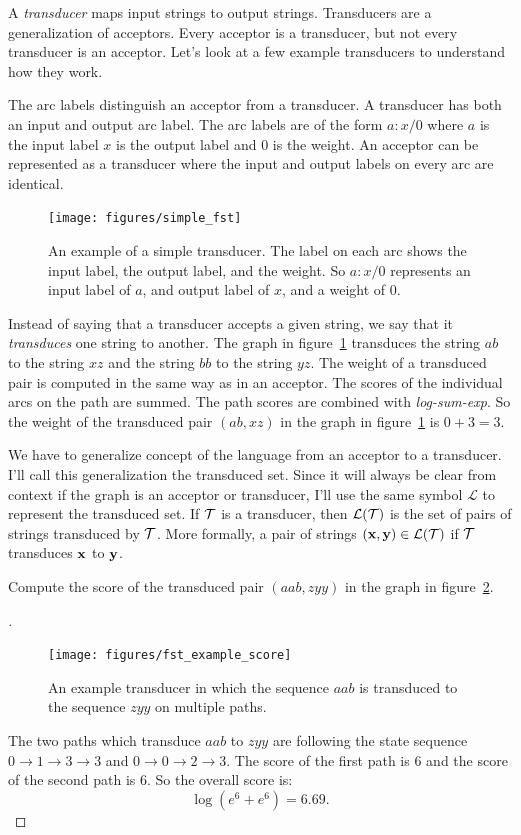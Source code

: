 A \emph{transducer} maps input strings to output strings. Transducers are a
generalization of acceptors. Every acceptor is a transducer, but not every
transducer is an acceptor. Let's look at a few example transducers to
understand how they work.

The arc labels distinguish an acceptor from a transducer. A transducer has both
an input and output arc label. The arc labels are of the form $a\!:\!x/0$ where
$a$ is the input label $x$ is the output label and $0$ is the weight. An
acceptor can be represented as a transducer where the input and output labels
on every arc are identical.

\begin{figure}
    \centering
    \texttt{[image: figures/simple\_fst]}
    \caption{An example of a simple transducer. The label on each arc shows the
    input label, the output label, and the weight. So $a\!:\!x/0$ represents an
    input label of $a$, and output label of $x$, and a weight of $0$.}
    \label{fig:simple_fst}
\end{figure}

Instead of saying that a transducer accepts a given string, we say that it
\emph{transduces} one string to another. The graph in
figure~\ref{fig:simple_fst} transduces the string $ab$ to the string $xz$ and
the string $bb$ to the string $yz$. The weight of a transduced pair is
computed in the same way as in an acceptor. The scores of the individual arcs
on the path are summed. The path scores are combined with \emph{log-sum-exp}.
So the weight of the transduced pair $(ab, xz)$ in the graph in
figure~\ref{fig:simple_fst} is $0+3 = 3$.

We have to generalize concept of the language from an acceptor to a transducer.
I'll call this generalization the transduced set. Since it will always be clear
from context if the graph is an acceptor or transducer, I'll use the same
symbol $\mathcal{L}$ to represent the transduced set. If $\mathcal{T}$ is a transducer,
then $\mathcal{L}(\mathcal{T})$ is the set of pairs of strings transduced by $\mathcal{T}$.
More formally, a pair of strings $({\bf x}, {\bf y}) \in \mathcal{L}(\mathcal{T})$ if $\mathcal{T}$
transduces ${\bf x}$ to ${\bf y}$.

\begin{example}
Compute the score of the transduced pair $(aab, zyy)$ in the graph in
figure~\ref{fig:fst_example_score}.
\end{example}

\begin{proof}[\unskip\nopunct]
\begin{figure}
    \centering
    \texttt{[image: figures/fst\_example\_score]}
    \caption{An example transducer in which the sequence $aab$ is transduced to
    the sequence $zyy$ on multiple paths.}
    \label{fig:fst_example_score}
\end{figure}

The two paths which transduce $aab$ to $zyy$ are following the state sequence
$0 \rightarrow 1 \rightarrow 3 \rightarrow 3$ and $0 \rightarrow 0 \rightarrow
2 \rightarrow 3$. The score of the first path is $6$ and the score of the
second path is $6$. So the overall score is:
$$
\log \left(e^6 + e^6\right) = 6.69.
$$
\end{proof}

